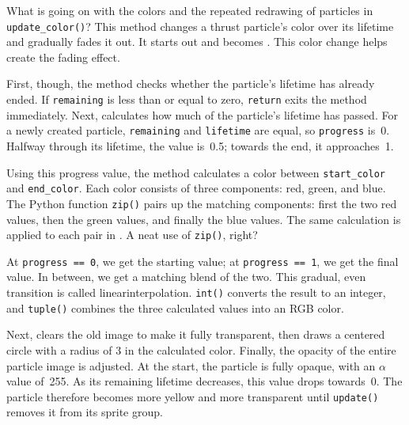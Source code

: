 What is going on with the colors and the repeated redrawing of particles in \texttt{update\-\_color()}? This method changes a thrust particle's color over its lifetime and gradually fades it out. It starts out  and becomes . This color change helps create the fading effect.

First, though, the method checks whether the particle's lifetime has already ended. If \texttt{remaining} is less than or equal to zero, \texttt{return} exits the method immediately. Next,  calculates how much of the particle's lifetime has passed. For a newly created particle, \texttt{remaining} and \texttt{lifetime} are equal, so \texttt{progress} is~0. Halfway through its lifetime, the value is~{0.5}; towards the end, it approaches~1.

Using this progress value, the method calculates a color between \texttt{start\_color} and \texttt{end\_color}. Each color consists of three components: red, green, and blue. The Python function \texttt{zip()} pairs up the matching components: first the two red values, then the green values, and finally the blue values. The same calculation is applied to each pair in . A neat use of \texttt{zip()}, right?

At \texttt{progress == 0}, we get the starting value; at \texttt{progress == 1}, we get the final value. In between, we get a matching blend of the two. This gradual, even transition is called \gls{linearinterpolation}. \texttt{int()} converts the result to an integer, and \texttt{tuple()} combines the three calculated values into an RGB color.

Next,  clears the old image to make it fully transparent, then draws a centered circle with a radius of \SI{3}{\pixel} in the calculated color. Finally, the opacity of the entire particle image is adjusted. At the start, the particle is fully opaque, with an $\alpha$ value of~255. As its remaining lifetime decreases, this value drops towards~0. The particle therefore becomes more yellow and more transparent until \texttt{update()} removes it from its sprite group.



